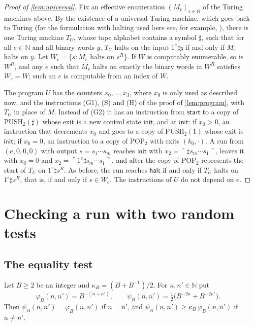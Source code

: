 \documentclass[11pt]{article}
\theoremstyle{plain}
\theoremstyle{definition}
\theoremstyle{remark}
\newcommand{\N}{\mathbb N}
\newcommand{\start}{\mathsf{start}}
\newcommand{\halt}{\mathsf{halt}}
\newcommand{\init}{\mathsf{init}}
\newcommand{\st}[1]{\ulcorner #1\urcorner}
\newcommand{\PUSH}{\mathrm{PUSH}}
\newcommand{\POP}{\mathrm{POP}}
\begin{document}
\begin{proof}[Proof of \cref{lem:universal}]
Fix an effective enumeration $(M_e)_{e\in\N}$ of the Turing machines above. By the existence of a universal Turing machine, which goes back to Turing \cite{Tur36} (for the formulation with halting used here see, for example, \cite{Min67,Soa16}), there is one Turing machine $T_U$, whose tape alphabet contains a symbol $\sharp$, such that for all $e\in\N$ and all binary words $y$, $T_U$ halts on the input $1^e\sharp y$ if and only if $M_e$ halts on $y$. Let $W_e=\{s:M_e\text{ halts on }s^R\}$. If $W$ is computably enumerable, so is $W^R$, and any $e$ such that $M_e$ halts on exactly the binary words in $W^R$ satisfies $W_e=W$; such an $e$ is computable from an index of $W$.

The program $U$ has the counters $x_0,\dots,x_3$, where $x_0$ is only used as described now, and the instructions (G1), (S) and (H) of the proof of \cref{lem:program}, with $T_U$ in place of $M$. Instead of (G2) it has an instruction from $\start$ to a copy of $\PUSH_2(\sharp)$ whose exit is a new control state $\init$, and at $\init$: if $x_0>0$, an instruction that decrements $x_0$ and goes to a copy of $\PUSH_2(1)$ whose exit is $\init$; if $x_0=0$, an instruction to a copy of $\POP_2$ with exits $(k_0,\cdot)$. A run from $(e,0,0,0)$ with output $s=s_1\cdots s_m$ reaches $\init$ with $x_2=\st{\sharp s_m\cdots s_1}$, leaves it with $x_0=0$ and $x_2=\st{1^e\sharp s_m\cdots s_1}$, and after the copy of $\POP_2$ represents the start of $T_U$ on $1^e\sharp s^R$. As before, the run reaches $\halt$ if and only if $T_U$ halts on $1^e\sharp s^R$, that is, if and only if $s\in W_e$. The instructions of $U$ do not depend on $e$.
\end{proof}

\section{Checking a run with two random tests}\label{sec:check}

\subsection{The equality test}

\begin{lemma}\label{lem:test}
Let $B\ge2$ be an integer and $\kappa_B=(B+B^{-1})/2$. For $n,n'\in\N$ put
\[
\varphi_B(n,n')=B^{-(n+n')},\qquad \psi_B(n,n')=\tfrac12\bigl(B^{-2n}+B^{-2n'}\bigr).
\]
Then $\psi_B(n,n')=\varphi_B(n,n')$ if $n=n'$, and $\psi_B(n,n')\ge\kappa_B\,\varphi_B(n,n')$ if $n\ne n'$.
\end{lemma}
\end{document}
